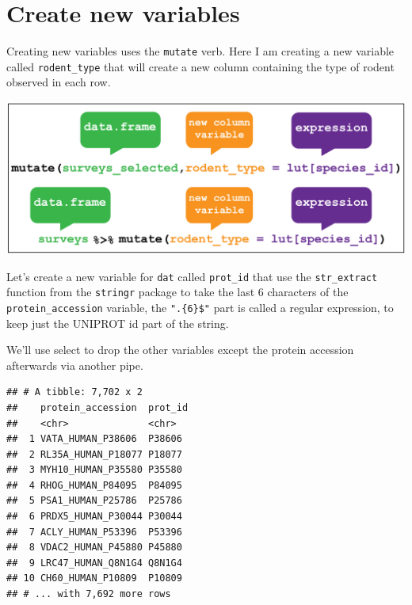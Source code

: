 \documentclass[12pt,]{book}
\newenvironment{Shaded}{\begin{snugshade}}{\end{snugshade}}
\newcommand{\KeywordTok}[1]{\textcolor[rgb]{0.13,0.29,0.53}{\textbf{#1}}}
\newcommand{\DataTypeTok}[1]{\textcolor[rgb]{0.13,0.29,0.53}{#1}}
\newcommand{\StringTok}[1]{\textcolor[rgb]{0.31,0.60,0.02}{#1}}
\newcommand{\OperatorTok}[1]{\textcolor[rgb]{0.81,0.36,0.00}{\textbf{#1}}}
\newcommand{\NormalTok}[1]{#1}
\theoremstyle{definition}
\theoremstyle{definition}
\theoremstyle{definition}
\theoremstyle{remark}
\begin{document}
\section{Create new variables}\label{mutate}

Creating new variables uses the \texttt{mutate} verb. Here I am creating
a new variable called \texttt{rodent\_type} that will create a new
column containing the type of rodent observed in each row.

\begin{center}\includegraphics[width=0.8\linewidth]{img/dplyr_mutate} \end{center}

Let's create a new variable for \texttt{dat} called \texttt{prot\_id}
that use the \texttt{str\_extract} function from the \texttt{stringr}
package to take the last 6 characters of the \texttt{protein\_accession}
variable, the \texttt{".\{6\}\$"} part is called a regular expression,
to keep just the UNIPROT id part of the string.

We'll use select to drop the other variables except the protein
accession afterwards via another pipe.

\begin{Shaded}
\end{Shaded}

\begin{verbatim}
## # A tibble: 7,702 x 2
##    protein_accession  prot_id
##    <chr>              <chr>  
##  1 VATA_HUMAN_P38606  P38606 
##  2 RL35A_HUMAN_P18077 P18077 
##  3 MYH10_HUMAN_P35580 P35580 
##  4 RHOG_HUMAN_P84095  P84095 
##  5 PSA1_HUMAN_P25786  P25786 
##  6 PRDX5_HUMAN_P30044 P30044 
##  7 ACLY_HUMAN_P53396  P53396 
##  8 VDAC2_HUMAN_P45880 P45880 
##  9 LRC47_HUMAN_Q8N1G4 Q8N1G4 
## 10 CH60_HUMAN_P10809  P10809 
## # ... with 7,692 more rows
\end{verbatim}
\end{document}
